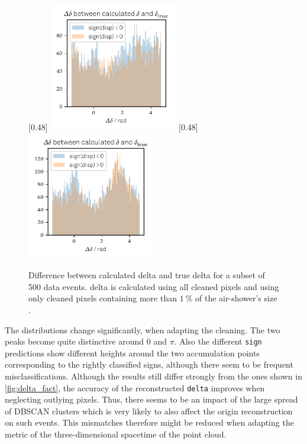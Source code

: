 \begin{figure}
  \subcaptionbox{\label{fig:delta_diff_a}}[0.48\textwidth]{
    \includegraphics[width=0.5\textwidth]{Plots/delta_delta/delta_true_diff_hist_thresholds_rad_20131104_162.pdf}
  }
  \subcaptionbox{\label{fig:delta_diff_perc}}[0.48\textwidth]{
    \includegraphics[width=0.5\textwidth]{Plots/delta_delta/delta_delta _DBSCAN_1perc_rad_20131104_162.pdf}
  }
  \caption{Difference between calculated delta and true delta for a subset of 500 data events. delta is calculated using all cleaned pixels \protect{} and using only cleaned pixels containing more than $\SI{1}{\percent}$ of the air-shower's size \protect{}.}
  \label{fig:true_delta}
\end{figure}
%
The distributions change significantly, when adapting the cleaning.
The two peaks become quite distinctive around $0$ and $\pi$. Also the
different \texttt{sign} predictions show different heights around the two
accumulation points corresponding to the rightly classified signs, although
there seem to be frequent misclassifications. Although the results still
differ strongly from the ones shown in \autoref{fig:delta_fact}, the
accuracy of the reconstructed \texttt{delta} improves when neglecting outlying pixels. Thus, there
seems to be an impact of the large spread of DBSCAN clusters which is very
likely to also affect the origin reconstruction on such events. This mismatches
therefore might be reduced when adapting the metric of the three-dimensional
spacetime of the point cloud.


